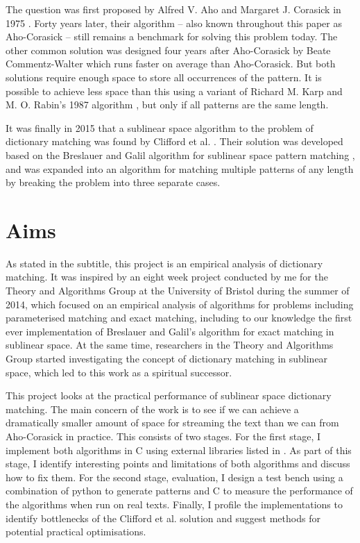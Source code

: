 \documentclass[ %
                    author={Dominic Joseph Moylett},
                    degree={MEng},
                     title={Dictionary Matching with Fingerprints},
                  subtitle={An Empirical Analysis},
                      type={research},
                      year={2015} ]{dissertation}
\begin{document}
The question was first proposed by Alfred V. Aho and Margaret J. Corasick in 1975 \cite{Aho:1975:ESM:360825.360855}. Forty years later, their algorithm -- also known throughout this paper as Aho-Corasick -- still remains a benchmark for solving this problem today. The other common solution was designed four years after Aho-Corasick by Beate Commentz-Walter \cite{commentz-walter:algo} which runs faster on average than Aho-Corasick. But both solutions require enough space to store all occurrences of the pattern. It is possible to achieve less space than this using a variant of Richard M. Karp and M. O. Rabin's 1987 algorithm \cite{5390135}, but only if all patterns are the same length.

It was finally in 2015 that a sublinear space algorithm to the problem of dictionary matching was found by Clifford et al. \cite{2015arXiv150406242C}. Their solution was developed based on the Breslauer and Galil algorithm for sublinear space pattern matching \cite{Breslauer:2014:RSS:2660854.2635814}, and was expanded into an algorithm for matching multiple patterns of any length by breaking the problem into three separate cases.

\section{Aims}

As stated in the subtitle, this project is an empirical analysis of dictionary matching. It was inspired by an eight week project conducted by me for the Theory and Algorithms Group at the University of Bristol during the summer of 2014, which focused on an empirical analysis of algorithms for problems including parameterised matching and exact matching, including to our knowledge the first ever implementation of Breslauer and Galil's algorithm for exact matching in sublinear space. At the same time, researchers in the Theory and Algorithms Group started investigating the concept of dictionary matching in sublinear space, which led to this work as a spiritual successor.

This project looks at the practical performance of sublinear space dictionary matching. The main concern of the work is to see if we can achieve a dramatically smaller amount of space for streaming the text than we can from Aho-Corasick in practice. This consists of two stages. For the first stage, I implement both algorithms in C using external libraries listed in . As part of this stage, I identify interesting points and limitations of both algorithms and discuss how to fix them. For the second stage, evaluation, I design a test bench using a combination of python to generate patterns and C to measure the performance of the algorithms when run on real texts. Finally, I profile the implementations to identify bottlenecks of the Clifford et al. solution and suggest methods for potential practical optimisations.
\end{document}
